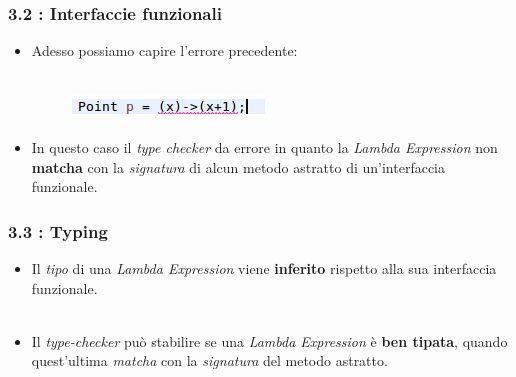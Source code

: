 \documentclass{beamer}
\begin{document}
\begin{frame}
	\frametitle{\textbf{3.2 : Interfaccie funzionali}}
	\begin{itemize}
		\item
			Adesso possiamo capire l'errore precedente:\\\
			\begin{figure}
				\centering
				\includegraphics[width=0.3\linewidth]{image/target.png}
				\label{fig:target}
			\end{figure}
		\item
			In questo caso il \textit{type checker} da errore in quanto la \textit{Lambda Expression} non \textbf{matcha} con la \textit{signatura} di alcun metodo astratto di un'interfaccia funzionale.
	\end{itemize}
\end{frame}


\begin{frame}
	\frametitle{\textbf{3.3 : Typing}}
	\begin{itemize}
		\item 
			Il \textit{tipo} di una \textit{Lambda Expression} viene \textbf{inferito} rispetto alla sua interfaccia funzionale.\\\
		\item 
			Il \textit{type-checker} può stabilire se una \textit{Lambda Expression} è \textbf{ben tipata}, quando quest'ultima \textit{matcha} con la \textit{signatura} del metodo astratto.\\\
	\end{itemize}
\end{frame}

\end{document}
